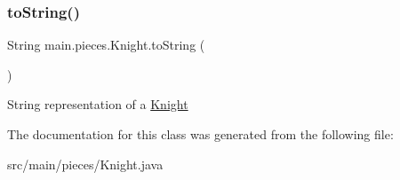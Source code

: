 \subsubsection{\texorpdfstring{to\+String()}{toString()}}
{\footnotesize\ttfamily String main.\+pieces.\+Knight.\+to\+String (\begin{DoxyParamCaption}{ }\end{DoxyParamCaption})}

String representation of a \hyperlink{classmain_1_1pieces_1_1_knight}{Knight} 

The documentation for this class was generated from the following file\+:\begin{DoxyCompactItemize}
\item 
src/main/pieces/Knight.\+java\end{DoxyCompactItemize}
